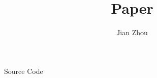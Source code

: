 \documentclass{article}
\title{Paper}
\author{Jian Zhou}
\begin{document}


\maketitle

Source Code \cite{source}



\end{document}
